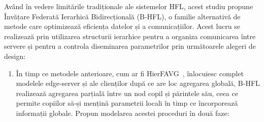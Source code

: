 Având în vedere limitările tradiționale ale sistemelor HFL, acest studiu propune Învățare Federată Ierarhică Bidirecțională (B-HFL), o familie alternativă de metode care optimizează eficiența datelor și a comunicațiilor. Acest lucru se realizează prin utilizarea structurii ierarhice pentru a organiza comunicarea între servere și pentru a controla diseminarea parametrilor prin următoarele alegeri de design:
\vspace{-0.1cm}
\begin{enumerate}
    \item În timp ce metodele anterioare, cum ar fi HierFAVG~\citep{Client-Edge-CloudHierFL,Hier_Het_Cellular}, înlocuiesc complet modelele edge-server și ale clienților după ce are loc agregarea globală, B-HFL realizează agregarea parțială între un nod copil și părintele său, ceea ce permite copiilor să-și mențină parametrii locali în timp ce încorporează informații globale. Propun modelarea acestei proceduri în două faze:


\end{enumerate}
